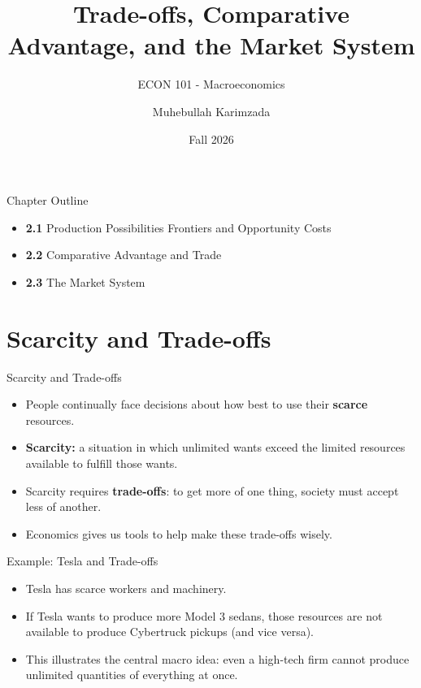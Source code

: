 \documentclass[aspectratio=169]{beamer}
\title{\textbf{Trade-offs, Comparative Advantage, and the Market System \vspace{.5cm}\\  }}
\subtitle{ {\large ECON 101 - Macroeconomics}}
\author{Muhebullah Karimzada}
\date{Fall 2026}
\begin{document}
\begin{frame}[plain]
  \titlepage
\end{frame}

\begin{frame}{Chapter Outline}
\transfade
\begin{itemize}
  \item \textbf{2.1} Production Possibilities Frontiers and Opportunity Costs
  \item \textbf{2.2} Comparative Advantage and Trade
  \item \textbf{2.3} The Market System
\end{itemize}
\end{frame}

\section{Scarcity and Trade-offs}

\begin{frame}{Scarcity and Trade-offs}
\transfade
\begin{itemize}
  \item People continually face decisions about how best to use their \textbf{scarce} resources.
  \item \textbf{Scarcity:} a situation in which unlimited wants exceed the limited resources available to fulfill those wants.
  \item Scarcity requires \textbf{trade-offs}: to get more of one thing, society must accept less of another.
  \item Economics gives us tools to help make these trade-offs wisely.
\end{itemize}
\end{frame}

\begin{frame}{Example: Tesla and Trade-offs}
\transfade
\begin{itemize}
  \item Tesla has scarce workers and machinery.
  \item If Tesla wants to produce more Model 3 sedans, those resources are not available to produce Cybertruck pickups (and vice versa).
  \item This illustrates the central macro idea: even a high-tech firm cannot produce unlimited quantities of everything at once.
\end{itemize}
\end{frame}
\end{document}
